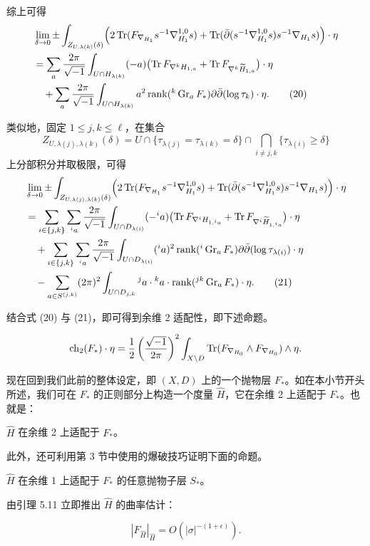 综上可得
\begin{align}
&\lim_{\delta\to 0}
\pm
\int_{Z_{U,\lambda(k)}(\delta)}
\Bigl(
2\operatorname{Tr}(F_{\nabla_{H_1}}s^{-1}\nabla^{1,0}_{H_1}s)
+
\operatorname{Tr}(\bar\partial(s^{-1}\nabla^{1,0}_{H_1}s)s^{-1}\nabla_{H_1}s)
\Bigr)\cdot \eta
\nonumber\\
&=
\sum_a \frac{2\pi}{\sqrt{-1}}
\int_{U\cap H_{\lambda(k)}}
(-a)\bigl(
\operatorname{Tr} F_{\nabla^kH_{1,a}}
+
\operatorname{Tr} F_{\nabla^k\widetilde H_{1,a}}
\bigr)\cdot \eta
\nonumber\\
&\quad
+
\sum_a \frac{2\pi}{\sqrt{-1}}
\int_{U\cap H_{\lambda(k)}}
a^2\operatorname{rank}({}^k\operatorname{Gr}_aF_*)\partial\bar\partial(\log\tau_k)\cdot \eta. \tag{20}
\end{align}

类似地，固定 \(1\le j,k\le \ell\)，在集合
\[
Z_{U,\lambda(j),\lambda(k)}(\delta)
=
U\cap\{\tau_{\lambda(j)}=\tau_{\lambda(k)}=\delta\}\cap
\bigcap_{i\ne j,k}\{\tau_{\lambda(i)}\ge \delta\}
\]
上分部积分并取极限，可得
\begin{align}
&\lim_{\delta\to 0}
\pm\int_{Z_{U,\lambda(j),\lambda(k)}(\delta)}
\Bigl(
2\operatorname{Tr}(F_{\nabla_{H_1}}s^{-1}\nabla^{1,0}_{H_1}s)
+
\operatorname{Tr}(\bar\partial(s^{-1}\nabla^{1,0}_{H_1}s)s^{-1}\nabla_{H_1}s)
\Bigr)\cdot \eta
\nonumber\\
&=
\sum_{i\in\{j,k\}}\sum_{{}^ia}
\frac{2\pi}{\sqrt{-1}}
\int_{U\cap D_{\lambda(i)}}
(-{}^ia)\bigl(
\operatorname{Tr} F_{\nabla^iH_{1,{}^ia}}
+
\operatorname{Tr} F_{\nabla^i\widetilde H_{1,{}^ia}}
\bigr)\cdot \eta
\nonumber\\
&\quad
+
\sum_{i\in\{j,k\}}\sum_{{}^ia}
\frac{2\pi}{\sqrt{-1}}
\int_{U\cap D_{\lambda(i)}}
({}^ia)^2\operatorname{rank}({}^i\operatorname{Gr}_aF_*)\partial\bar\partial(\log\tau_{\lambda(i)})\cdot \eta
\nonumber\\
&\quad
-
\sum_{a\in S^{(j,k)}}
(2\pi)^2
\int_{U\cap D_{j,k}}
{}^ja\cdot {}^ka\cdot \operatorname{rank}({}^{jk}\operatorname{Gr}_aF_*)\cdot \eta. \tag{21}
\end{align}

结合式 (20) 与 (21)，即可得到余维 2 适配性，即下述命题。

\begin{proposition}
\[
\operatorname{ch}_2(F_*)\cdot \eta
=
\frac12\left(\frac{\sqrt{-1}}{2\pi}\right)^2
\int_{X\setminus D}
\operatorname{Tr}(F_{\nabla_{H_0}}\wedge F_{\nabla_{H_0}})\wedge \eta.
\]
\end{proposition}

现在回到我们此前的整体设定，即 \((X,D)\) 上的一个抛物层 \(F_*\)。如在本小节开头所述，我们可在 \(F_*\) 的正则部分上构造一个度量 \(\widehat{H}\)，它在余维 2 上适配于 \(F_*\)。也就是：

\begin{proposition}
\(\widehat{H}\) 在余维 2 上适配于 \(F_*\)。
\end{proposition}

此外，还可利用第 3 节中使用的爆破技巧证明下面的命题。

\begin{proposition}
\(\widehat{H}\) 在余维 1 上适配于 \(F_*\) 的任意抛物子层 \(S_*\)。
\end{proposition}

由引理 5.11 立即推出 \(\widehat{H}\) 的曲率估计：

\begin{lemma}
\[
|F_{\widehat{H}}|_{\widehat{H}}=O(|\sigma|^{-(1+\epsilon)}).
\]
\end{lemma}